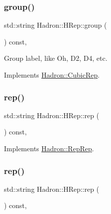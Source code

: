 \subsubsection{\texorpdfstring{group()}{group()}\hspace{0.1cm}{\footnotesize\ttfamily [2/2]}}
{\footnotesize\ttfamily std\+::string Hadron\+::\+H\+Rep\+::group (\begin{DoxyParamCaption}{ }\end{DoxyParamCaption}) const\hspace{0.3cm}{\ttfamily [inline]}, {\ttfamily [virtual]}}

Group label, like Oh, D2, D4, etc. 

Implements \mbox{\hyperlink{structHadron_1_1CubicRep_a0748f11ec87f387062c8e8981339a29c}{Hadron\+::\+Cubic\+Rep}}.

\mbox{\label{structHadron_1_1HRep_aa90a43bdbf19213e75180e0457ae36d0}} 
\subsubsection{\texorpdfstring{rep()}{rep()}\hspace{0.1cm}{\footnotesize\ttfamily [1/3]}}
{\footnotesize\ttfamily std\+::string Hadron\+::\+H\+Rep\+::rep (\begin{DoxyParamCaption}{ }\end{DoxyParamCaption}) const\hspace{0.3cm}{\ttfamily [inline]}, {\ttfamily [virtual]}}



Implements \mbox{\hyperlink{structHadron_1_1RepRep_ab3213025f6de249f7095892109575fde}{Hadron\+::\+Rep\+Rep}}.

\mbox{\label{structHadron_1_1HRep_aa90a43bdbf19213e75180e0457ae36d0}} 
\subsubsection{\texorpdfstring{rep()}{rep()}\hspace{0.1cm}{\footnotesize\ttfamily [2/3]}}
{\footnotesize\ttfamily std\+::string Hadron\+::\+H\+Rep\+::rep (\begin{DoxyParamCaption}{ }\end{DoxyParamCaption}) const\hspace{0.3cm}{\ttfamily [inline]}, {\ttfamily [virtual]}}



